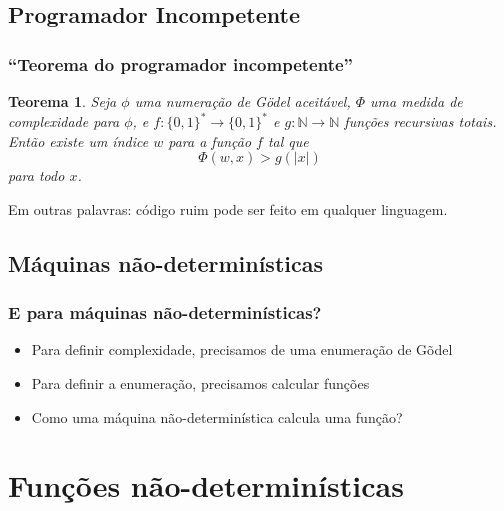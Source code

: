 \documentclass[utf8,notheorems]{beamer}
\newtheorem*{theorem}{Teorema}
\theoremstyle{definition}
\begin{document}
\subsection{Programador Incompetente}
\begin{frame}
    \frametitle{``Teorema do programador incompetente''}
    \begin{theorem}
        Seja $\phi$ uma numeração de Gödel aceitável,
        $\Phi$ uma medida de complexidade para $\phi$,
        e $f: \{0, 1\}^* \to \{0, 1\}^*$ e $g: \mathbb N \to \mathbb N$
        funções recursivas totais.
        Então existe um índice $w$ para a função $f$ tal que
        \begin{equation*}
            \Phi(w, x) > g(|x|)
        \end{equation*}
        para todo $x$.
    \end{theorem}

    \pause
    Em outras palavras: código ruim pode ser feito em qualquer linguagem.
\end{frame}

\subsection{Máquinas não-determinísticas}
\begin{frame}
    \frametitle{E para máquinas não-determinísticas?}

    \begin{itemize}
        \item Para definir complexidade, precisamos de uma enumeração de Gõdel
        \item Para definir a enumeração, precisamos calcular funções
        \item Como uma máquina não-determinística calcula uma função?
    \end{itemize}
\end{frame}

\section{Funções não-determinísticas}
\end{document}
